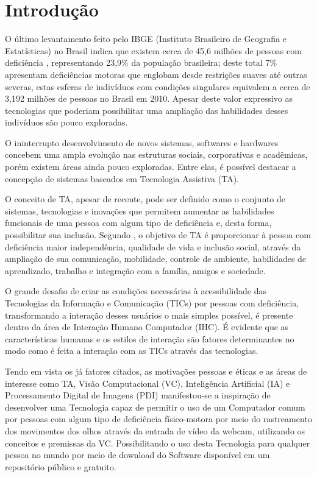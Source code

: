 \chapter{Introdução}\label{CAP:introducao}

O último levantamento feito pelo IBGE (Instituto Brasileiro de Geografia e Estatísticas) no Brasil indica que existem cerca de 45,6 milhões de pessoas com deficiência , representando 23,9\% da população brasileira; deste total 7\% apresentam deficiências motoras que englobam desde restrições suaves até outras severas, estas esferas de indivíduos com condições singulares equivalem a cerca de 3,192 milhões de pessoas no Brasil em 2010. Apesar deste valor expressivo as tecnologias que poderiam possibilitar uma ampliação das habilidades desses indivíduos são pouco exploradas.

O ininterrupto desenvolvimento de novos sistemas, softwares e hardwares concebem uma ampla evolução nas estruturas sociais, corporativas e acadêmicas, porém existem áreas ainda pouco exploradas. Entre elas, é possível destacar a concepção de sistemas baseados em Tecnologia Assistiva (TA).

O conceito de TA, apesar de recente, pode ser definido como o conjunto de sistemas, tecnologias e inovações que permitem aumentar as habilidades funcionais de uma pessoa com algum tipo de deficiência e, desta forma, possibilitar sua inclusão. Segundo , o objetivo de TA é proporcionar à pessoa com deficiência maior independência, qualidade de vida e inclusão social, através da ampliação de sua comunicação, mobilidade, controle de ambiente, habilidades de aprendizado, trabalho e integração com a família, amigos e sociedade.

O grande desafio de criar as condições necessárias à acessibilidade das Tecnologias da Informação e Comunicação (TICs) por pessoas com deficiência, transformando a interação desses usuários o mais simples possível, é presente dentro da área de Interação Humano Computador (IHC). É evidente que as características humanas e os estilos de interação são fatores determinantes no modo como é feita a interação com as TICs através das tecnologias.

Tendo em vista os já fatores citados, as motivações pessoas e éticas e as áreas de interesse como TA, Visão Computacional (VC), Inteligência Artificial (IA) e Processamento Digital de Imagens (PDI) manifestou-se a inspiração de desenvolver uma Tecnologia capaz de permitir o uso de um Computador comum por pessoas com algum tipo de deficiência físico-motora por meio do rastreamento dos movimentos dos olhos através da entrada de vídeo da webcam, utilizando os conceitos e premissas da VC. Possibilitando o uso desta Tecnologia para qualquer pessoa no mundo por meio de download do Software disponível em um repositório público e gratuito.

